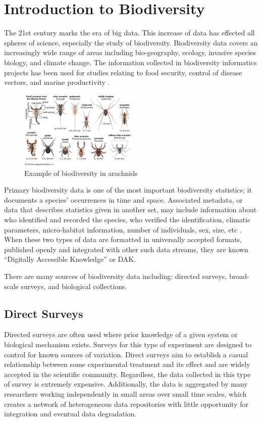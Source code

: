 \section{Introduction to Biodiversity}

The 21st century marks the era of big data. This increase of data has effected all spheres of science, especially the study of biodiversity.
Biodiversity data covers an increasingly wide range of areas including bio-geography, ecology, invasive species biology, and climate change.
The information collected in biodiversity informatics projects has been used for studies relating to food security, control of disease vectors, and marine productivity \cite{Barve}.  
\begin{figure}[htbp!] 
   \centering
   \includegraphics[width=0.5\textwidth]{pictures/biodiversity/spiders.jpg} 
   \caption{Example of biodiversity in arachnids}
   \label{fig:arachnids}
\end{figure}

Primary biodiversity data is one of the most important biodiversity statistics; it documents a species' occurrences in time and space.
Associated metadata, or data that describes statistics given in another set, may include information about who identified and recorded the species, who verified the identification, climatic parameters, micro-habitat information, number of individuals, sex, size, etc \cite{Barve}.
When these two types of data are formatted in universally accepted formats, published openly and integrated with other such data streams, they are known “Digitally Accessible Knowledge” or DAK.

There are many sources of biodiversity data including: directed surveys, broad-scale surveys, and biological collections. 

\subsection{Direct Surveys}

Directed surveys are often used where prior knowledge of a given system or biological mechanism exists.
Surveys for this type of experiment are designed to control for known sources of variation\cite {GBIFbirds}.
Direct surveys aim to establish a casual relationship between some experimental treatment and its effect and are widely accepted in the scientific community.
Regardless, the data collected in this type of survey is extremely expensive.
Additionally, the data is aggregated by many researchers working independently in small areas over small time scales, which creates a network of heterogeneous data repositories with little opportunity for integration and eventual data degradation.


